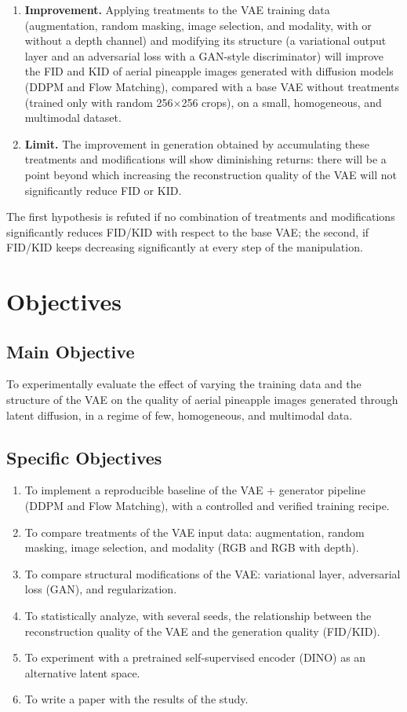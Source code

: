 \begin{enumerate}
  \item \textbf{Improvement.} Applying treatments to the VAE training data (augmentation, random masking, image selection, and modality, with or without a depth channel) and modifying its structure (a variational output layer and an adversarial loss with a GAN-style discriminator) will improve the FID and KID of aerial pineapple images generated with diffusion models (DDPM and Flow Matching), compared with a base VAE without treatments (trained only with random 256$\times$256 crops), on a small, homogeneous, and multimodal dataset.
  \item \textbf{Limit.} The improvement in generation obtained by accumulating these treatments and modifications will show diminishing returns: there will be a point beyond which increasing the reconstruction quality of the VAE will not significantly reduce FID or KID.
\end{enumerate}

The first hypothesis is refuted if no combination of treatments and modifications significantly reduces FID/KID with respect to the base VAE; the second, if FID/KID keeps decreasing significantly at every step of the manipulation.

\section{Objectives}

\subsection{Main Objective}

To experimentally evaluate the effect of varying the training data and the structure of the VAE on the quality of aerial pineapple images generated through latent diffusion, in a regime of few, homogeneous, and multimodal data.

\subsection{Specific Objectives}

\begin{enumerate}
  \item To implement a reproducible baseline of the VAE + generator pipeline (DDPM and Flow Matching), with a controlled and verified training recipe.
  \item To compare treatments of the VAE input data: augmentation, random masking, image selection, and modality (RGB and RGB with depth).
  \item To compare structural modifications of the VAE: variational layer, adversarial loss (GAN), and regularization.
  \item To statistically analyze, with several seeds, the relationship between the reconstruction quality of the VAE and the generation quality (FID/KID).
  \item To experiment with a pretrained self-supervised encoder (DINO) as an alternative latent space.
  \item To write a paper with the results of the study.
\end{enumerate}

